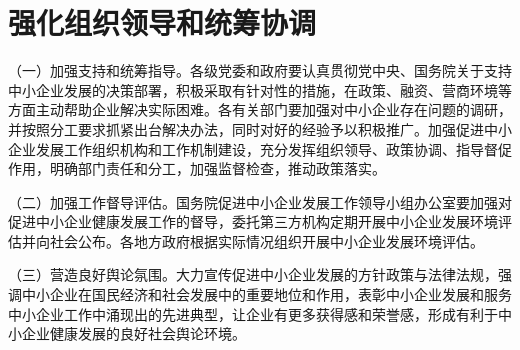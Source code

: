 \section{强化组织领导和统筹协调}

（一）加强支持和统筹指导。各级党委和政府要认真贯彻党中央、国务院关于支持中小企业发展的决策部署，积极采取有针对性的措施，在政策、融资、营商环境等方面主动帮助企业解决实际困难。各有关部门要加强对中小企业存在问题的调研，并按照分工要求抓紧出台解决办法，同时对好的经验予以积极推广。加强促进中小企业发展工作组织机构和工作机制建设，充分发挥组织领导、政策协调、指导督促作用，明确部门责任和分工，加强监督检查，推动政策落实。

（二）加强工作督导评估。国务院促进中小企业发展工作领导小组办公室要加强对促进中小企业健康发展工作的督导，委托第三方机构定期开展中小企业发展环境评估并向社会公布。各地方政府根据实际情况组织开展中小企业发展环境评估。

（三）营造良好舆论氛围。大力宣传促进中小企业发展的方针政策与法律法规，强调中小企业在国民经济和社会发展中的重要地位和作用，表彰中小企业发展和服务中小企业工作中涌现出的先进典型，让企业有更多获得感和荣誉感，形成有利于中小企业健康发展的良好社会舆论环境。
